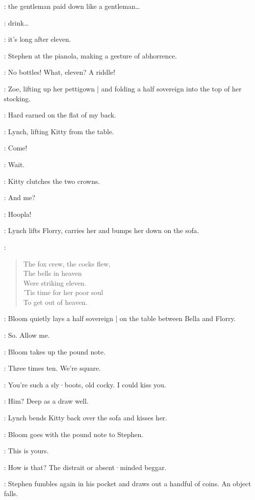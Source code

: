 \Zoe:
the gentleman paid down like a gentleman…

\Lynch:
drink…

\Bella:
it's long after eleven.

:
Stephen at the pianola,
making a gesture of abhorrence.

\Stephen:
No bottles!
What,
eleven?
A riddle!

:
Zoe,
lifting up her pettigown |
and folding a half sovereign into the top of her stocking.

\Zoe:
Hard earned on the flat of my back.

:
Lynch,
lifting Kitty from the table.

\Lynch:
Come!

\Kitty:
Wait.

:
Kitty clutches the two crowns.

\Florry:
And me?

\Lynch:
Hoopla!

:
Lynch lifts Florry,
carries her and bumps her down on the sofa.

\Stephen:
\begin{verse}
    The fox crew, the cocks flew,\\
    The bells in heaven\\
    Were striking eleven.\\
%
    'Tis time for her poor soul\\
    To get out of heaven.
\end{verse}

:
Bloom quietly lays a half sovereign |
on the table between Bella and Florry.

\Bloom:
So.
Allow me.

:
Bloom takes up the pound note.

\Bloom:
Three times ten.
We're square.

\Bella:
You're such a sly·boots,
old cocky.
I could kiss you.

\Zoe:
Him?
Deep as a draw well.

:
Lynch bends Kitty back over the sofa and kisses her.

:
Bloom goes with the pound note to Stephen.

\Bloom:
This is yours.

\Stephen:
How is that?
The distrait or absent·minded beggar.

:
Stephen fumbles again in his pocket and draws out a handful of coins.
An object falls.

